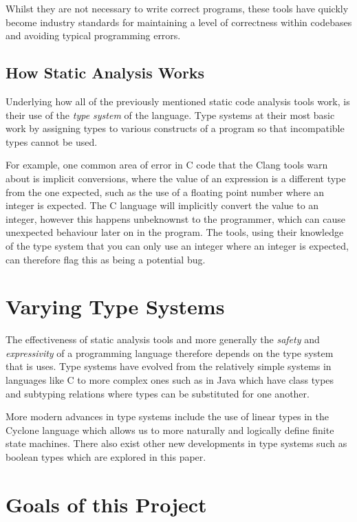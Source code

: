 \documentclass{l4proj}
\begin{document}
Whilst they are not necessary to write correct programs, these tools have quickly become industry standards for maintaining a level of correctness within codebases and avoiding typical programming errors.

\subsection{How Static Analysis Works}

Underlying how all of the previously mentioned static code analysis tools work, is their use of the \emph{type system} of the language.
Type systems at their most basic work by assigning types to various constructs of a program so that incompatible types cannot be used.

For example, one common area of error in C code that the Clang tools warn about is implicit conversions, where the value of an expression is a different type from the one expected, such as the use of a floating point number where an integer is expected.
The C language will implicitly convert the value to an integer, however this happens unbeknownst to the programmer, which can cause unexpected behaviour later on in the program.
The tools, using their knowledge of the type system that you can only use an integer where an integer is expected, can therefore flag this as being a potential bug.

\section{Varying Type Systems}

The effectiveness of static analysis tools and more generally the \emph{safety} and \emph{expressivity} of a programming language therefore depends on the type system that is uses.
Type systems have evolved from the relatively simple systems in languages like C to more complex ones such as in Java which have class types and subtyping relations where types can be substituted for one another.

More modern advances in type systems include the use of linear types in the Cyclone \citep{grossman2002} language which allows us to more naturally and logically define finite state machines.
There also exist other new developments in type systems such as boolean types which are explored in this paper.

\section{Goals of this Project}
\end{document}
